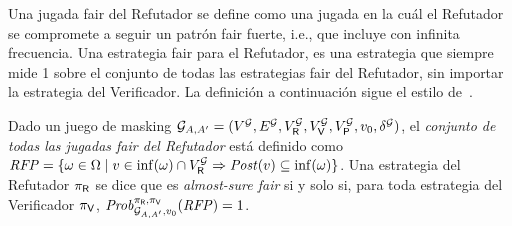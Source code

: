 



Una jugada fair del Refutador se define como una jugada en la cuál el Refutador se compromete a seguir un patrón fair fuerte, i.e., que incluye con infinita frecuencia. Una estrategia fair para el Refutador, es una estrategia que siempre mide 1 sobre el conjunto de todas las estrategias fair del Refutador, sin importar la estrategia del Verificador. La definición a continuación sigue el estilo de~\cite{DBLP:journals/dc/BaierK98,BaierK08,CastroDDP22}.



%
\begin{definition}
  Dado un juego de masking
  $\mathcal{G}_{A,A'} = (V^{\mathcal{G}}, E^{\mathcal{G}}, V^{\mathcal{G}}_{\mathsf{R}}, V^{\mathcal{G}}_{\mathsf{V}}, V^{\mathcal{G}}_{\mathsf{P}}, v_0, \delta^{\mathcal{G}})$,
  el \emph{conjunto de todas las jugadas fair del Refutador} está definido como
  $ 
	\mathit{RFP} = \{ \omega \in \Omega \mid v \in \inf(\omega) \cap V^{\mathcal{G}}_{\mathsf{R}} \Rightarrow \mathit{Post}(v) \subseteq \inf(\omega) \}
  $.
  Una estrategia del Refutador $\pi_{\mathsf{R}}$ se dice que es \emph{almost-sure fair} si y solo si, para toda estrategia del Verificador
  $\pi_{\mathsf{V}}$,
  $\mathit{Prob}^{\pi_{\mathsf{R}}, \pi_{\mathsf{V}}}_{\mathcal{G}_{A,A'},v_0}(\mathit{RFP}) = 1$.
\end{definition}


